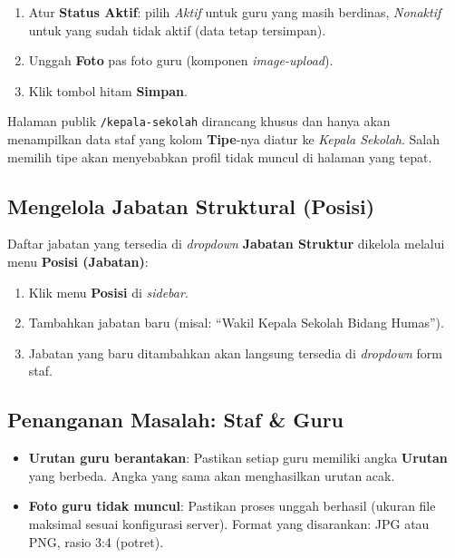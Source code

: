 \begin{enumerate}
  \item Atur \textbf{Status Aktif}: pilih \textit{Aktif} untuk guru yang masih berdinas,
        \textit{Nonaktif} untuk yang sudah tidak aktif (data tetap tersimpan).
  \item Unggah \textbf{Foto} pas foto guru (komponen \textit{image-upload}).
  \item Klik tombol hitam \textbf{Simpan}.
\end{enumerate}

\begin{warnbox}
  Halaman publik \texttt{/kepala-sekolah} dirancang khusus dan hanya akan menampilkan
  data staf yang kolom \textbf{Tipe}-nya diatur ke \textit{Kepala Sekolah}. Salah memilih
  tipe akan menyebabkan profil tidak muncul di halaman yang tepat.
\end{warnbox}

\subsection{Mengelola Jabatan Struktural (Posisi)}

Daftar jabatan yang tersedia di \textit{dropdown} \textbf{Jabatan Struktur} dikelola
melalui menu \textbf{Posisi (Jabatan)}:

\begin{enumerate}
  \item Klik menu \textbf{Posisi} di \textit{sidebar}.
  \item Tambahkan jabatan baru (misal: ``Wakil Kepala Sekolah Bidang Humas'').
  \item Jabatan yang baru ditambahkan akan langsung tersedia di \textit{dropdown}
        form staf.
\end{enumerate}

\subsection{Penanganan Masalah: Staf \& Guru}

\begin{itemize}
  \item \textbf{Urutan guru berantakan}: Pastikan setiap guru memiliki angka
        \textbf{Urutan} yang berbeda. Angka yang sama akan menghasilkan urutan acak.
  \item \textbf{Foto guru tidak muncul}: Pastikan proses unggah berhasil
        (ukuran file maksimal sesuai konfigurasi server). Format yang disarankan:
        JPG atau PNG, rasio 3:4 (potret).
\end{itemize}

